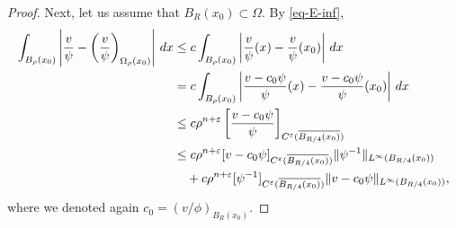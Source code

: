 \documentclass[11pt,reqno]{amsart}
\theoremstyle{plain}
\theoremstyle{definition}
\numberwithin{equation}{section}
\newcommand{\1}{\mathbbm{1}}
\renewcommand{\d}{\textnormal{\,d}}
\begin{document}
\begin{proof}
Next, let us assume that $B_{R}(x_0) \subset \Omega$. By \eqref{eq-E-inf},
\begin{align*}
\int_{B_{\rho}(x_0)} \left|\frac{v}{\psi} - \left( \frac{v}{\psi} \right)_{\Omega_{\rho}(x_0)} \right| \d x
&\le c \int_{B_{\rho}(x_0)} \left|\frac{v}{\psi}(x) - \frac{v}{\psi}(x_0) \right| \d x \\
& = c \int_{B_{\rho}(x_0)} \left|\frac{v - c_0 \psi}{\psi}(x) - \frac{v - c_0 \psi}{\psi}(x_0) \right| \d x \\
&\le c \rho^{n+\varepsilon} \left[ \frac{v - c_0 \psi}{\psi} \right]_{C^{\varepsilon}(\overline{B_{R/4}(x_0)})} \\
&\leq c \rho^{n+\varepsilon} [v - c_0 \psi]_{C^{\varepsilon}(\overline{B_{R/4}(x_0)})} \Vert \psi^{-1} \Vert_{L^{\infty}(B_{R/4}(x_0))} \\
&\quad + c \rho^{n+\varepsilon} [\psi^{-1}]_{C^{\varepsilon}(\overline{B_{R/4}(x_0)})} \Vert v - c_0 \psi \Vert_{L^{\infty}(B_{R/4}(x_0))},
\end{align*}
where we denoted again $c_0 = (v/\phi)_{B_R(x_0)}$.


\end{proof}
\end{document}
